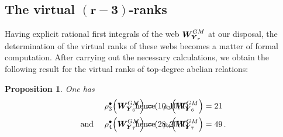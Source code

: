 \documentclass[11pt]{amsart}
\newtheorem{prop}[thm]{Proposition}
\begin{document}
\subsection{\bf The virtual $\boldsymbol{(r-3)}$-ranks}
Having explicit rational first integrals of the web $\boldsymbol{W}^{GM}_{\hspace{-0.05cm}\boldsymbol{Y}_r}$ at our disposal, the determination of the virtual ranks of these webs becomes a matter of formal computation. After carrying out the necessary calculations, we obtain the following result for the virtual ranks of top-degree abelian relations:
\begin{prop}%
\label{Prop:Virtual-Ranks-r=6,7}%
%
%
%
%
%
%
One has 
\begin{align*}
\rho^{\bullet}_3\Big( 
\boldsymbol{W}^{GM}_{\hspace{-0.05cm}\boldsymbol{ Y}_6}
\Big)
=  &\,  (10,10,1) 
&& \hspace{-2.65cm}  \mbox{hence} \quad 
\rho_3\Big( 
\boldsymbol{W}^{GM}_{\hspace{-0.05cm}\boldsymbol{Y}_6}
\Big)
=  21\\
\mbox{ and } \quad 
\rho^{\bullet}_4\Big( 
\boldsymbol{W}^{GM}_{\hspace{-0.05cm}\boldsymbol{Y}_7}
\Big)
=  &\, (28,20,1) 
&& \hspace{-2.65cm} \mbox{hence} \quad 
\rho_4\Big( 
\boldsymbol{W}^{GM}_{\hspace{-0.05cm}\boldsymbol{Y}_7}
\Big)
=  49\, . 
\end{align*}
\end{prop}%



\end{document}
